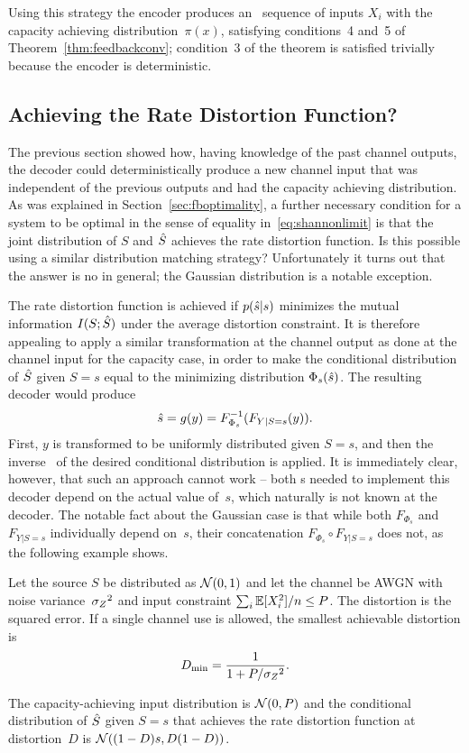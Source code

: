 Using this strategy the encoder produces an \iid\ sequence of inputs $X_i$
with the capacity achieving distribution~$\pi(x)$, satisfying conditions~4 and~5
of Theorem~\ref{thm:feedbackconv}; condition~3 of the theorem is satisfied
trivially because the encoder is deterministic.


\subsection{Achieving the Rate Distortion Function?}

The previous section showed how, having knowledge of the past channel outputs,
the decoder could deterministically produce a new channel input that was
independent of the previous outputs and had the capacity achieving distribution.
As was explained in Section~\ref{sec:fboptimality}, a further necessary
condition for a system to be optimal in the sense of equality
in~\eqref{eq:shannonlimit} is
that the joint distribution of $S$ and ${\hat{S}}$ achieves the rate distortion
function. Is this possible using a similar distribution matching strategy?
Unfortunately it turns out that the answer is no in general; the Gaussian
distribution is a notable exception.

The rate distortion function is achieved if $p({\hat{s}}|s)$ minimizes the mutual
information $I(S;{\hat{S}})$ under the average distortion constraint. It is therefore
appealing to apply a similar transformation at the channel output as done at the
channel input for the capacity case, in order to make the conditional
distribution of ${\hat{S}}$ given $S=s$ equal to the minimizing distribution
$\Phi_s({\hat{s}})$. The resulting decoder would produce
\begin{equation}
  \label{eq:distmatchdec}
  {\hat{s}} = g(y) = F_{\Phi_s}^{-1}(F_{Y|S=s}(y)).
\end{equation}
First, $y$ is transformed to be uniformly distributed given $S=s$, and then the
inverse \cdf\ of the desired conditional distribution is applied. It is
immediately clear, however, that such an approach cannot work -- both \cdf s
needed to implement this decoder depend on the actual value of~$s$, which
naturally is not known at the decoder. The notable fact about the Gaussian
case is that while both $F_{\Phi_s}$ and $F_{Y|S=s}$ individually depend on~$s$,
their concatenation $F_{\Phi_s} \circ F_{Y|S=s}$ does not, as the following
example shows. 

\begin{example}
  Let the source $S$ be distributed as $\mathcal{N}(0,1)$ and let the channel be AWGN
  with noise variance~${{\sigma_Z}^2}$ and input constraint $\sum_i \mathbb{E}[X_i^2]/n \le P$.
  The distortion is the squared error. If a single channel use is allowed,  the
  smallest achievable distortion is
  \begin{equation}
    \label{eq:exmindist}
    D_{\min} = \frac{1}{1 + P/{{\sigma_Z}^2}}.
  \end{equation}
\end{example}
The capacity-achieving input distribution is $\mathcal{N}(0,P)$ and the conditional
distribution of ${\hat{S}}$ given $S=s$ that achieves the rate distortion function at
distortion~$D$ is $\mathcal{N}((1-D)s, D(1-D))$.

